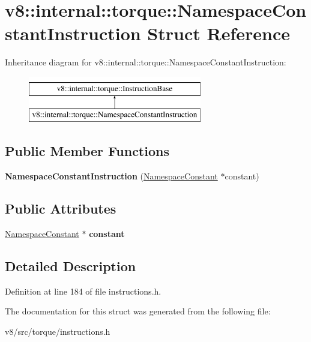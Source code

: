 \hypertarget{structv8_1_1internal_1_1torque_1_1NamespaceConstantInstruction}{}\section{v8\+:\+:internal\+:\+:torque\+:\+:Namespace\+Constant\+Instruction Struct Reference}
\label{structv8_1_1internal_1_1torque_1_1NamespaceConstantInstruction}
Inheritance diagram for v8\+:\+:internal\+:\+:torque\+:\+:Namespace\+Constant\+Instruction\+:\begin{figure}[H]
\begin{center}
\leavevmode
\includegraphics[height=2.000000cm]{structv8_1_1internal_1_1torque_1_1NamespaceConstantInstruction}
\end{center}
\end{figure}
\subsection*{Public Member Functions}
\begin{DoxyCompactItemize}
\item 
\mbox{\label{structv8_1_1internal_1_1torque_1_1NamespaceConstantInstruction_a64488047841917feb38a577645b87974}} 
{\bfseries Namespace\+Constant\+Instruction} (\mbox{\hyperlink{classv8_1_1internal_1_1torque_1_1NamespaceConstant}{Namespace\+Constant}} $\ast$constant)
\end{DoxyCompactItemize}
\subsection*{Public Attributes}
\begin{DoxyCompactItemize}
\item 
\mbox{\label{structv8_1_1internal_1_1torque_1_1NamespaceConstantInstruction_a6b46b9a8ab14c63a9f950f23b32498aa}} 
\mbox{\hyperlink{classv8_1_1internal_1_1torque_1_1NamespaceConstant}{Namespace\+Constant}} $\ast$ {\bfseries constant}
\end{DoxyCompactItemize}


\subsection{Detailed Description}


Definition at line 184 of file instructions.\+h.



The documentation for this struct was generated from the following file\+:\begin{DoxyCompactItemize}
\item 
v8/src/torque/instructions.\+h\end{DoxyCompactItemize}
